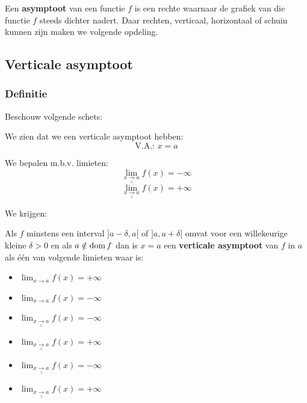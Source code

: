 \documentclass[12pt]{article}
\newenvironment{definitie}
{
  \vspace{0.4cm}
  \begin{mdframed}[nobreak=true,frametitle={Definitie}]
  }{%
  \end{mdframed}
}
\begin{document}
\begin{theorie}

Een {\bf asymptoot} van een functie $f$ is een rechte waarnaar de grafiek van die functie $f$ steeds dichter nadert. Daar rechten, verticaal, horizontaal of schuin kunnen zijn maken we volgende opdeling.

\subsection{Verticale asymptoot}

\subsubsection*{Definitie}

\begin{minipage}{0.5\textwidth}
Beschouw volgende schets:
\begin{center}
\end{center}  
\end{minipage}
\begin{minipage}{0.5\textwidth}
We zien dat we een verticale asymptoot hebben:
$$\mbox{V.A.: }x=a$$

We bepalen m.b.v. limieten:
$$\lim_{x\underset{<}{\to}a} f(x)=-\infty$$
$$\lim_{x\underset{>}{\to}a} f(x)=+\infty$$
\vfill
\end{minipage}

We krijgen:

\begin{definitie}
Als $f$ minstens een interval $]a-\delta,a[$ of $]a,a+\delta[$ omvat voor een willekeurige kleine $\delta>0$ en als $a\notin \dom f$ dan is $x=a$ een {\bf verticale asymptoot} van $f$ in $a$ als één van volgende limieten waar is:
\begin{multicols}{3}
  \begin{itemize}
    \item $\lim_{x\to a} f(x)=+\infty$
    \item $\lim_{x\to a} f(x)=-\infty$
    \item $\lim_{x\underset{<}{\to}a} f(x)=-\infty$
    \item $\lim_{x\underset{<}{\to}a} f(x)=+\infty$
    \item $\lim_{x\underset{>}{\to}a} f(x)=-\infty$
    \item $\lim_{x\underset{>}{\to}a} f(x)=+\infty$
  \end{itemize}
\end{multicols}
\end{definitie}


\end{theorie}
\end{document}
